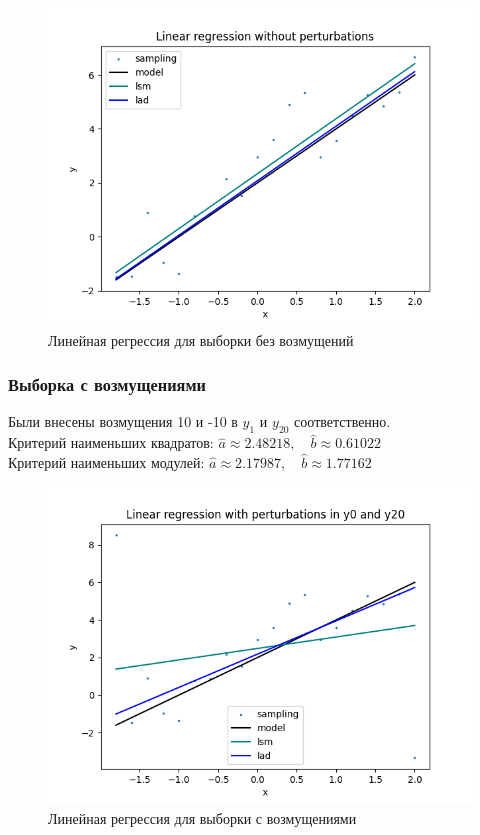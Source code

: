 \begin{figure}[H]
	\begin{center}
		\includegraphics[scale=0.7]{regression_without_pert.png}
	\end{center}
	\caption{Линейная регрессия для выборки без возмущений}
\end{figure}

\subsubsection{Выборка с возмущениями}

Были внесены возмущения 10 и -10 в $y_1$ и $y_{20}$ соответственно. \\

Критерий наименьших квадратов: $\hat{a} \approx 2.48218, \quad \hat{b} \approx 0.61022$ \\

Критерий наименьших модулей: $\hat{a} \approx 2.17987, \quad \hat{b} \approx 1.77162$

\begin{figure}[H]
	\begin{center}
		\includegraphics[scale=0.7]{regression_with_pert.png}
	\end{center}
	\caption{Линейная регрессия для выборки с возмущениями}
\end{figure}

